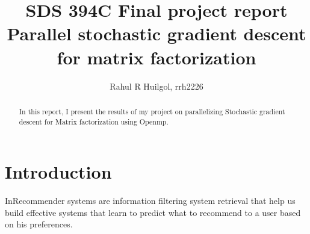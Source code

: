 \documentclass[a4paper,11pt]{article}
\title{SDS 394C Final project report\\{\Large Parallel stochastic gradient descent for matrix factorization}}
\author{Rahul R Huilgol, rrh2226}
\begin{document}
\maketitle
\tableofcontents

\begin{abstract}
In this report, I present the results of my project on parallelizing Stochastic gradient descent for Matrix factorization using Openmp. 
\end{abstract}

\section{Introduction}
InRecommender systems are information filtering system retrieval that help us build effective systems that learn to predict what to recommend to a user based on his preferences. 
\end{document}
